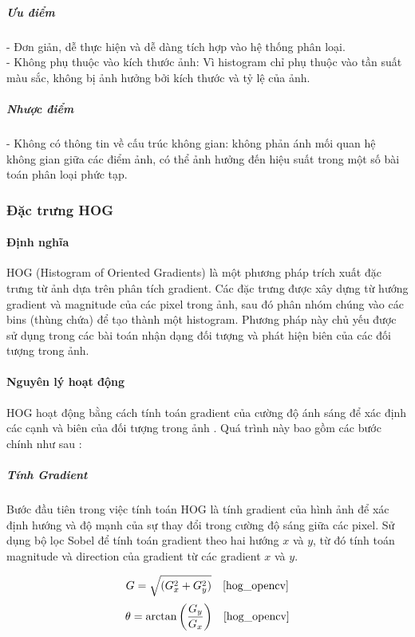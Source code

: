 \documentclass[a4paper,12pt]{article}
\begin{document}
\subparagraph{Ưu điểm}
- Đơn giản, dễ thực hiện và dễ dàng tích hợp vào hệ thống phân loại.\\
- Không phụ thuộc vào kích thước ảnh: Vì histogram chỉ phụ thuộc vào tần suất màu sắc, không bị ảnh hưởng bởi kích thước và tỷ lệ của ảnh.\\

\subparagraph{Nhược điểm}
- Không có thông tin về cấu trúc không gian: không phản ánh mối quan hệ không gian giữa các điểm ảnh, có thể ảnh hưởng đến hiệu suất trong một số bài toán phân loại phức tạp.\\

\subsubsection{Đặc trưng HOG}

\paragraph{Định nghĩa}
\hspace{5mm}HOG (Histogram of Oriented Gradients) là một phương pháp trích xuất đặc trưng từ ảnh dựa trên phân tích gradient. Các đặc trưng được xây dựng từ hướng gradient và magnitude của các pixel trong ảnh, sau đó phân nhóm chúng vào các bins (thùng chứa) để tạo thành một histogram. Phương pháp này chủ yếu được sử dụng trong các bài toán nhận dạng đối tượng và phát hiện biên của các đối tượng trong ảnh.

\paragraph{Nguyên lý hoạt động}
\hspace{5mm}HOG hoạt động bằng cách tính toán gradient của cường độ ánh sáng để xác định các cạnh và biên của đối tượng trong ảnh . Quá trình này bao gồm các bước chính như sau \cite{hog_opencv}:

\subparagraph{Tính Gradient}
\hspace{5mm}Bước đầu tiên trong việc tính toán HOG là tính gradient của hình ảnh để xác định hướng và độ mạnh của sự thay đổi trong cường độ sáng giữa các pixel. Sử dụng bộ lọc Sobel để tính toán gradient theo hai hướng \(x\) và \(y\), từ đó tính toán magnitude và direction của gradient từ các gradient \(x\) và \(y\).

\[
G = \sqrt{(G_x^2 + G_y^2)} \quad \text{\cite{hog_opencv}}
\]
\[
\theta = \arctan{\left(\frac{G_y}{G_x}\right)} \quad \text{\cite{hog_opencv}}
\]
\end{document}

